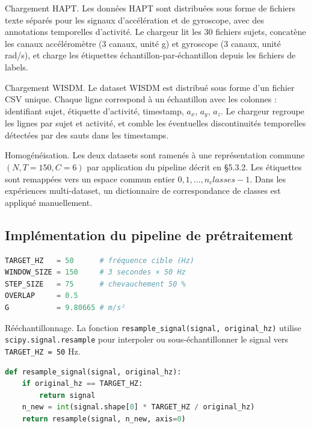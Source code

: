 \documentclass[a4paper,12pt]{report}
\begin{document}
Chargement HAPT. Les données HAPT sont distribuées sous forme de fichiers texte séparés pour les signaux d'accélération et de gyroscope, avec des annotations temporelles d'activité. Le chargeur lit les 30 fichiers sujets, concatène les canaux accéléromètre (3 canaux, unité g) et gyroscope (3 canaux, unité rad/s), et charge les étiquettes échantillon-par-échantillon depuis les fichiers de labels.

Chargement WISDM. Le dataset WISDM est distribué sous forme d'un fichier CSV unique. Chaque ligne correspond à un échantillon avec les colonnes : identifiant sujet, étiquette d'activité, timestamp, $a_x$, $a_y$, $a_z$. Le chargeur regroupe les lignes par sujet et activité, et comble les éventuelles discontinuités temporelles détectées par des sauts dans les timestamps.

Homogénéisation. Les deux datasets sont ramenés à une représentation commune $(N, T=150, C=6)$ par application du pipeline décrit en §5.3.2. Les étiquettes sont remappées vers un espace commun entier ${0, 1, \ldots, n_classes-1}$. Dans les expériences multi-dataset, un dictionnaire de correspondance de classes est appliqué manuellement.

\subsection{Implémentation du pipeline de prétraitement}

\begin{lstlisting}[language=Python,caption={Constantes globales du prétraitement (\texttt{preprocessing.py})},label=lst:preproc_const]
TARGET_HZ   = 50      # fréquence cible (Hz)
WINDOW_SIZE = 150     # 3 secondes × 50 Hz
STEP_SIZE   = 75      # chevauchement 50 %
OVERLAP     = 0.5
G           = 9.80665 # m/s²
\end{lstlisting}

Rééchantillonnage. La fonction \texttt{resample\_signal(signal, original\_hz)} utilise \texttt{scipy.signal.resample} pour interpoler ou sous-échantillonner le signal vers \texttt{TARGET\_HZ = 50} Hz.

\begin{lstlisting}[language=Python,caption={Rééchantillonnage à 50 Hz},label=lst:resample]
def resample_signal(signal, original_hz):
    if original_hz == TARGET_HZ:
        return signal
    n_new = int(signal.shape[0] * TARGET_HZ / original_hz)
    return resample(signal, n_new, axis=0)
\end{lstlisting}
\end{document}
